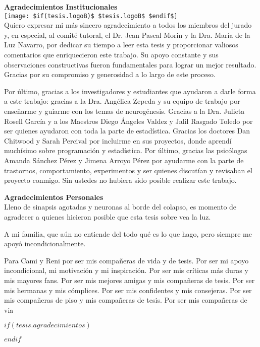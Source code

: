 \newpage
    \begin{center}
        {\large \textbf{Agradecimientos Institucionales}}\\[0.3cm]
        \texttt{[image: \$if(tesis.logoB)\$ \$tesis.logoB\$ \$endif\$]}\\[0.5cm]
        Quiero expresar mi más sincero agradecimiento a todos los miembros del jurado y, en especial, al comité tutoral, el Dr. Jean Pascal Morin y la Dra. María de la Luz Navarro, por dedicar su tiempo a leer esta tesis y proporcionar valiosos comentarios que enriquecieron este trabajo. Su apoyo constante y sus observaciones constructivas fueron fundamentales para lograr un mejor resultado. Gracias por su compromiso y generosidad a lo largo de este proceso.
        
        Por último, gracias a los investigadores y estudiantes que ayudaron a darle forma a este trabajo: gracias a la Dra. Angélica Zepeda y su equipo de trabajo por enseñarme y guiarme con los temas de neurogénesis. Gracias a la Dra. Julieta Rosell García y a los Maestros Diego Ángeles Valdez y Jalil Rasgado Toledo por ser quienes ayudaron con toda la parte de estadística. Gracias los doctores Dan Chitwood y Sarah Percival por incluirme en sus proyectos, donde aprendí muchísimo sobre programación y estadística. Por último, gracias las psicólogas Amanda Sánchez Pérez y Jimena Arroyo Pérez por ayudarme con la parte de trastornos, comportamiento, experimentos y ser quienes discutían y revisaban el proyecto conmigo. Sin ustedes no hubiera sido posible realizar este trabajo.
    \end{center}




\newpage
    \begin{center}
        {\large \textbf{Agradecimientos Personales}}\\[0.3cm]
        Lleno de sinapsis agotadas y neuronas al borde del colapso, es momento de agradecer a quienes hicieron posible que esta tesis sobre vea la luz.

        A mi familia, que aún no entiende del todo qué es lo que hago, pero siempre me apoyó incondicionalmente. 

    \end{center}

\newpage
    \begin{center}
        Para Cami y Reni por ser mis compañeras de vida y de tesis. Por ser mi apoyo incondicional, mi motivación y mi inspiración. Por ser mis críticas más duras y mis mayores fans. Por ser mis mejores amigas y mis compañeras de tesis. Por ser mis hermanas y mis cómplices. Por ser mis confidentes y mis consejeras. Por ser mis compañeras de piso y mis compañeras de tesis. Por ser mis compañeras de via
    \end{center}

\newpage
\begin{center}
\end{center}

\newpage

$if(tesis.agradecimientos)$

$endif$

\newpage
\tableofcontents